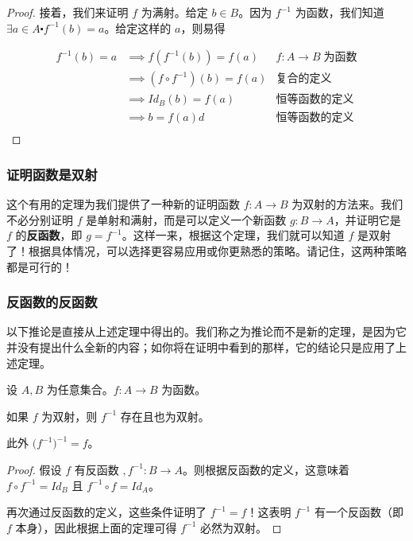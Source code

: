 \begin{proof}
    接着，我们来证明 $f$ 为满射。给定 $b \in B$。因为 $f^{-1}$ 为函数，我们知道 $\exists a \in A \centerdot f^{-1}(b)=a$。给定这样的 $a$，则易得

    \begin{align*}
        f^{-1}(b) = a &\implies f(f^{-1}(b)) = f(a) & f : A \to B \;\text{为函数} \\
        &\implies (f \circ f^{-1})(b) = f(a) & \text{复合的定义} \\
        &\implies Id_B(b) = f(a) & \textbf{恒等函数的定义} \\
        &\implies b = f(a) d& \textbf{恒等函数的定义} \\
    \end{align*}
\end{proof}

\subsubsection*{证明函数是双射}

这个有用的定理为我们提供了一种新的证明函数 $f : A \to B$ 为双射的方法来。我们不必分别证明 $f$ 是单射和满射，而是可以定义一个新函数 $g : B \to A$，并证明它是 $f$ 的\textbf{反函数}，即 $g = f^{-1}$。这样一来，根据这个定理，我们就可以知道 $f$ 是双射了！根据具体情况，可以选择更容易应用或你更熟悉的策略。请记住，这两种策略都是可行的！

\subsubsection*{反函数的反函数}

以下推论是直接从上述定理中得出的。我们称之为推论而不是新的定理，是因为它并没有提出什么全新的内容；如你将在证明中看到的那样，它的结论只是应用了上述定理。

\begin{corollary}
    设 $A, B$ 为任意集合。$f : A \to B$ 为函数。

    如果 $f$ 为双射，则 $f^{-1}$ 存在且也为双射。

    此外 $\big(f^{-1}\big)^{-1} = f$。
\end{corollary}

\begin{proof}
    假设 $f$ 有反函数 $, f^{-1} : B \to A$。则根据反函数的定义，这意味着 $f \circ f^{-1} = Id_B$ 且 $f^{-1} \circ f = Id_A$。

    再次通过反函数的定义，这些条件证明了 $f^{-1}=f$！这表明 $f^{-1}$ 有一个反函数（即 $f$ 本身），因此根据上面的定理可得 $f^{-1}$ 必然为双射。
\end{proof}

